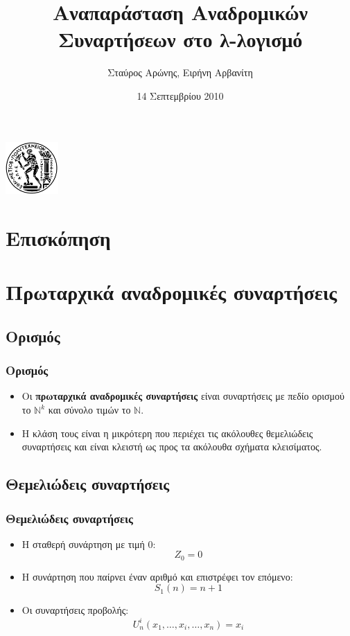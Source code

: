 \documentclass{beamer}
\title[Αναδρομικές Συναρτήσεις στο λ-λογισμό]{Αναπαράσταση Αναδρομικών Συναρτήσεων στο λ-λογισμό}
\author{Σταύρος Αρώνης, Ειρήνη Αρβανίτη}
\date{14 Σεπτεμβρίου 2010}
\institute{Εφαρμογές της λογικής στην Πληροφορική\\Σχολή ΗΜΜΥ, ΕΜΠ}
\begin{document}
\begin{frame}
        \titlepage
        \begin{center}
                \includegraphics[height=2cm]{pyrforos.png}
        \end{center}
\end{frame}

\section*{Επισκόπηση}

\begin{frame}
  \tableofcontents[hidesubsections]
\end{frame}

\section{Πρωταρχικά αναδρομικές συναρτήσεις}

\subsection{Ορισμός}

\begin{frame}
        \frametitle{Ορισμός}
        \begin{itemize}
                \item   Οι \textbf{πρωταρχικά αναδρομικές συναρτήσεις} 
                                είναι συναρτήσεις με πεδίο ορισμού το \( \mathbb{N}^k \) 
                                και σύνολο τιμών το \( \mathbb{N} \).
                \pause
                \item   Η κλάση τους είναι η μικρότερη που περιέχει τις ακόλουθες
                                θεμελιώδεις συναρτήσεις και είναι κλειστή ως προς τα ακόλουθα
                                σχήματα κλεισίματος.
        \end{itemize}
\end{frame}

\subsection{Θεμελιώδεις συναρτήσεις}

\begin{frame}
        \frametitle{Θεμελιώδεις συναρτήσεις}
        \begin{itemize}
                \item Η σταθερή συνάρτηση με τιμή 0: \[Z_0=0\]
                \pause
                \item Η συνάρτηση που παίρνει έναν αριθμό και επιστρέφει τον επόμενο: \[S_1(n)=n+1\]
                \pause
                \item Οι συναρτήσεις προβολής: \[U^i_n(x_1,\ldots,x_i,\ldots,x_n)=x_i\]
        \end{itemize}
\end{frame}
\end{document}
